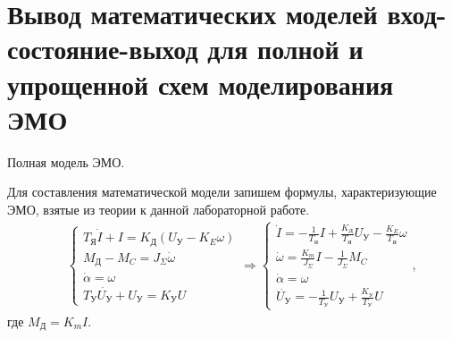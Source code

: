 \documentclass[a4paper,12pt]{article} %
\begin{document}
\newpage
\section{Вывод математических моделей вход-состояние-выход для полной и упрощенной схем моделирования ЭМО}
Полная модель ЭМО.\par
Для составления математической модели запишем формулы, характеризующие ЭМО, взятые из теории к данной лабораторной работе.
\begin{align}
	&&\begin{cases}
		T_\text{Я}\dot{I} + I = K_\text{Д}(U_\text{У} - K_E\omega)\\
		M_\text{Д} - M_C = J_\Sigma\dot{\omega}\\
		\dot{\alpha} = \omega\\
		T_\text{У}\dot{U_\text{У}} + U_\text{У} = K_\text{У}U
	\end{cases}
	\Rightarrow
	\begin{cases}
		\dot{I} = \displaystyle{- \frac{1}{T_\text{Я}}I + \frac{K_\text{Д}}{T_\text{Я}}U_\text{У} -\frac{K_E}{T_\text{Я}}}\omega \\
		\dot{\omega} = \displaystyle{\frac{K_m}{J_\Sigma}}I - \frac{1}{J_\Sigma}M_C\\
		\dot{\alpha} = \omega\\
		\dot{U_\text{У}} = -\displaystyle{\frac{1}{T_\text{У}}U_\text{У}} + \frac{K_\text{У}}{T_\text{У}}U
	\end{cases}
	,
	\label{ESETh}
\end{align}
где $M_\text{Д} = K_mI$.
	
\end{document}

